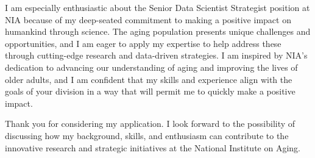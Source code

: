 \documentclass[11pt,letterpaper,sans]{moderncv}        %
\begin{document}
I am especially enthusiastic about the Senior Data Scientist Strategist position at NIA because of my deep-seated commitment to making a positive impact on humankind through science. The aging population presents unique challenges and opportunities, and I am eager to apply my expertise to help address these through cutting-edge research and data-driven strategies. I am inspired by NIA's dedication to advancing our understanding of aging and improving the lives of older adults, and I am confident that my skills and experience align with the goals of your division in a way that will permit me to quickly make a positive impact.

Thank you for considering my application. I look forward to the possibility of discussing how my background, skills, and enthusiasm can contribute to the innovative research and strategic initiatives at the National Institute on Aging.

\makeletterclosing
\end{document}
